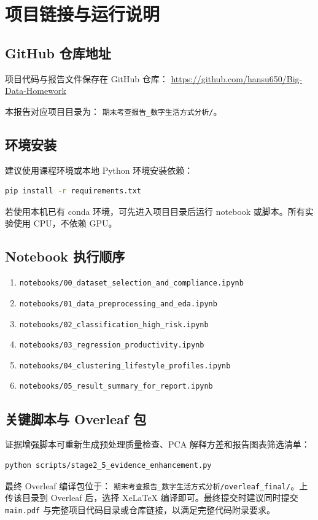 \chapter{项目链接与运行说明}

\section{GitHub 仓库地址}

项目代码与报告文件保存在 GitHub 仓库：
\url{https://github.com/hansu650/Big-Data-Homework}

本报告对应项目目录为：
\texttt{期末考查报告\_数字生活方式分析/}。

\section{环境安装}

建议使用课程环境或本地 Python 环境安装依赖：

\begin{lstlisting}[language=bash,caption={环境安装命令示意},label={lst:install}]
pip install -r requirements.txt
\end{lstlisting}

若使用本机已有 conda 环境，可先进入项目目录后运行 notebook 或脚本。所有实验使用 CPU，不依赖 GPU。

\section{Notebook 执行顺序}

\begin{enumerate}
  \item \texttt{notebooks/00\_dataset\_selection\_and\_compliance.ipynb}
  \item \texttt{notebooks/01\_data\_preprocessing\_and\_eda.ipynb}
  \item \texttt{notebooks/02\_classification\_high\_risk.ipynb}
  \item \texttt{notebooks/03\_regression\_productivity.ipynb}
  \item \texttt{notebooks/04\_clustering\_lifestyle\_profiles.ipynb}
  \item \texttt{notebooks/05\_result\_summary\_for\_report.ipynb}
\end{enumerate}

\section{关键脚本与 Overleaf 包}

证据增强脚本可重新生成预处理质量检查、PCA 解释方差和报告图表筛选清单：

\begin{lstlisting}[language=bash,caption={Stage 2.5 证据增强脚本},label={lst:stage25}]
python scripts/stage2_5_evidence_enhancement.py
\end{lstlisting}

最终 Overleaf 编译包位于：
\texttt{期末考查报告\_数字生活方式分析/overleaf\_final/}。上传该目录到 Overleaf 后，选择 XeLaTeX 编译即可。最终提交时建议同时提交 \texttt{main.pdf} 与完整项目代码目录或仓库链接，以满足完整代码附录要求。

